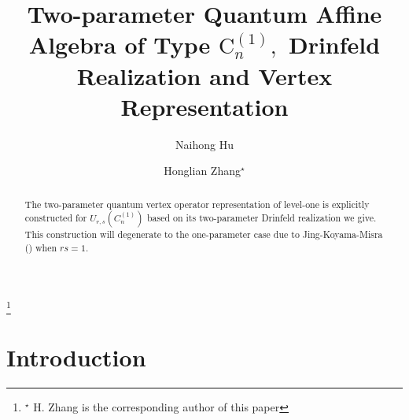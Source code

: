 \documentclass{amsproc}
\theoremstyle{remark}
\numberwithin{equation}{section}
\begin{document}
\title[two-parameter quantum affine algebra for type $C_n^{(1)}$]
{Two-parameter Quantum Affine Algebra of Type ${\mathrm C_n^{(1)}},$
Drinfeld Realization and Vertex Representation}

\author[Hu]{Naihong Hu}
\address{Department of Mathematics,  Shanghai Key Laboratory of Pure Mathematics and Mathematical Practice, East China Normal University,
Shanghai 200241, PR China} 

\author[Zhang]{Honglian Zhang$^{\star}$}
\address{Department of Mathematics,
Shanghai University, Shanghai 200444, PR China}

\thanks{$^\star$ H. Zhang is the corresponding author of this paper}


\begin{abstract}
The two-parameter quantum vertex operator representation of level-one is explicitly constructed for $U_{r,s}(C^{(1)}_n)$ based on its two-parameter Drinfeld realization we give.
This construction will degenerate to the one-parameter case due to Jing-Koyama-Misra (\cite{JKM2}) when $rs=1$.
\end{abstract}

\maketitle

\section{Introduction}
\medskip
\end{document}
